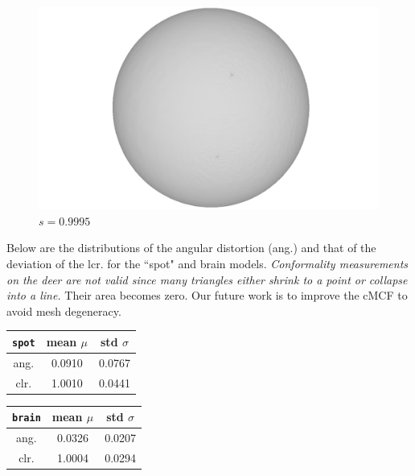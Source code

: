 \documentclass[11pt]{amsart}
\begin{document}
\begin{figure}[H]
\begin{center}
\hfill
\begin{minipage}[!h]{0.33\textwidth}
\centering
\includegraphics[width=\textwidth]{christmasdeerCMCF22b}
\caption*{$s = 0.9995$} \label{fig:christmasdeercmcf22}
\end{minipage}
\end{center}
\end{figure}

Below are the distributions of the angular distortion (ang.) and that of the deviation of the lcr. for the ``spot" and brain models. \textit{Conformality measurements on the deer are not valid since many triangles either shrink to a point or collapse into a line.} Their area becomes zero. Our future work is to improve the cMCF to avoid mesh degeneracy.
\begin{table}[H]
\begin{center}
\begin{minipage}[!h]{.4\textwidth}
\centering
\begin{tabular}{c|c|c}
\texttt{spot}& mean $\mu$ & std $\sigma$ \\ \hline 
ang. & 0.0910 & 0.0767 \\ \hline
clr. & 1.0010 & 0.0441 \\ 
\end{tabular}
\end{minipage}%
\hfill
\begin{minipage}[!h]{0.4\textwidth}
\centering
\begin{tabular}{c|c|c}
\texttt{brain}& mean  $\mu$ & std $\sigma$ \\ \hline 
ang. & 0.0326 & 0.0207 \\ \hline
clr. & 1.0004 & 0.0294 \\ 
\end{tabular}
\end{minipage}%
\end{center}
\end{table}
\end{document}
